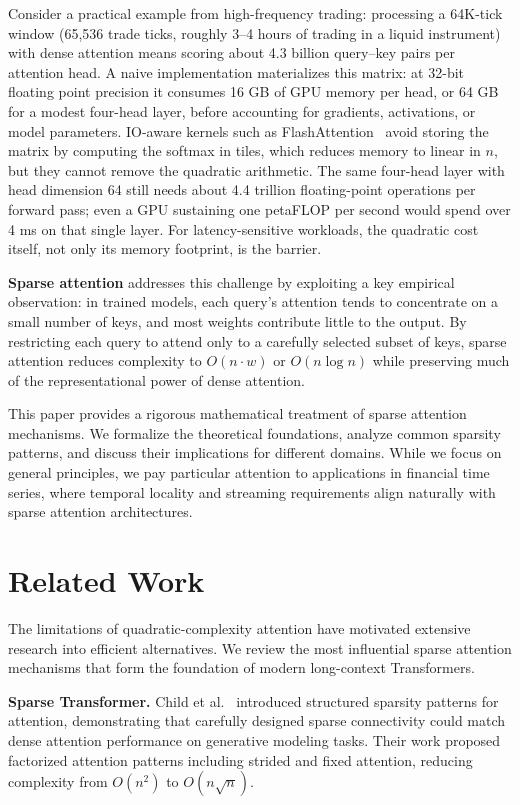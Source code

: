 \documentclass{article}
\begin{document}
Consider a practical example from high-frequency trading: processing a 64K-tick window (65,536 trade ticks, roughly 3--4 hours of trading in a liquid instrument) with dense attention means scoring about 4.3 billion query--key pairs per attention head. A naive implementation materializes this matrix: at 32-bit floating point precision it consumes 16 GB of GPU memory per head, or 64 GB for a modest four-head layer, before accounting for gradients, activations, or model parameters. IO-aware kernels such as FlashAttention~\cite{dao2022flashattention} avoid storing the matrix by computing the softmax in tiles, which reduces memory to linear in \(n\), but they cannot remove the quadratic arithmetic. The same four-head layer with head dimension 64 still needs about 4.4 trillion floating-point operations per forward pass; even a GPU sustaining one petaFLOP per second would spend over 4 ms on that single layer. For latency-sensitive workloads, the quadratic cost itself, not only its memory footprint, is the barrier.

\textbf{Sparse attention} addresses this challenge by exploiting a key empirical observation: in trained models, each query's attention tends to concentrate on a small number of keys, and most weights contribute little to the output. By restricting each query to attend only to a carefully selected subset of keys, sparse attention reduces complexity to \(O(n \cdot w)\) or \(O(n \log n)\) while preserving much of the representational power of dense attention.

This paper provides a rigorous mathematical treatment of sparse attention mechanisms. We formalize the theoretical foundations, analyze common sparsity patterns, and discuss their implications for different domains. While we focus on general principles, we pay particular attention to applications in financial time series, where temporal locality and streaming requirements align naturally with sparse attention architectures.

\section{Related Work}

The limitations of quadratic-complexity attention have motivated extensive research into efficient alternatives. We review the most influential sparse attention mechanisms that form the foundation of modern long-context Transformers.

\textbf{Sparse Transformer.} Child et al.~\cite{child2019generating} introduced structured sparsity patterns for attention, demonstrating that carefully designed sparse connectivity could match dense attention performance on generative modeling tasks. Their work proposed factorized attention patterns including strided and fixed attention, reducing complexity from \(O(n^2)\) to \(O(n \sqrt{n})\).
\end{document}
